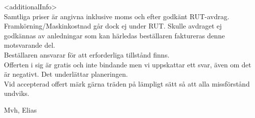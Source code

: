 \documentclass[a4paper,11pt]{extarticle}
\newcommand{\changefont}{%
        \fontsize{9}{11}\selectfont
    }
\begin{document}
\renewcommand\arraystretch{1}

\vspace{2em}
<additionalInfo> \\

Samtliga priser är angivna inklusive moms och efter godkänt RUT-avdrag. Framkörning/Maskinkostnad går dock ej under RUT. Skulle avdraget ej godkännas av anledningar som kan härledas beställaren faktureras denne motsvarande del. \\

Beställaren ansvarar för att erforderliga tillstånd finns. \\

Offerten i sig är gratis och inte bindande men vi uppskattar ett svar, även om det är negativt. Det underlättar planeringen. \\

Vid accepterad offert märk gärna träden på lämpligt sätt så att alla missförstånd undviks.

Mvh, Elias

\end{document}
